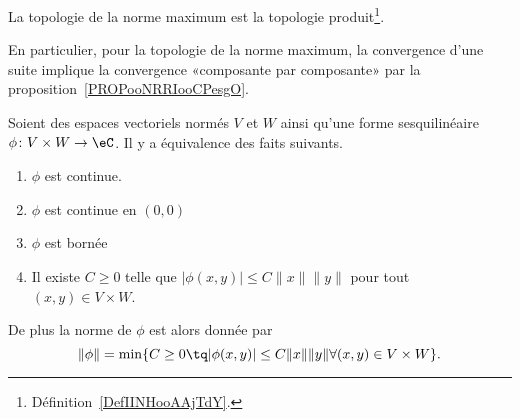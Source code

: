 \begin{lemma}       \label{LEMooWVVCooIGgAdJ}
    La topologie de la norme maximum est la topologie produit\footnote{Définition~\ref{DefIINHooAAjTdY}.}.
\end{lemma}

En particulier, pour la topologie de la norme maximum, la convergence d'une suite implique la convergence «composante par composante» par la proposition~\ref{PROPooNRRIooCPesgO}.

\begin{proposition}      \label{PROPooQFTSooPFfbCc}
    Soient des espaces vectoriels normés \( V\) et \( W\) ainsi qu'une forme sesquilinéaire \( \phi\colon V\times W\to \eC\). Il y a équivalence des faits suivants.
    \begin{enumerate}
        \item
            \( \phi\) est continue.
        \item
            \( \phi\) est continue en \( (0,0)\)
        \item
            \( \phi\) est bornée
        \item
            Il existe \( C\geq 0\) telle que \( | \phi(x,y) |\leq C\| x \|\| y \|  \) pour tout \( (x,y)\in V\times W\).
    \end{enumerate}
    De plus la norme de \( \phi\) est alors donnée par
    \begin{equation}
        \| \phi \|=\min\{  C\geq 0\tq | \phi(x,y) |\leq C\| x \|\| y \|\forall (x,y)\in V\times W  \}.
    \end{equation}
\end{proposition}

